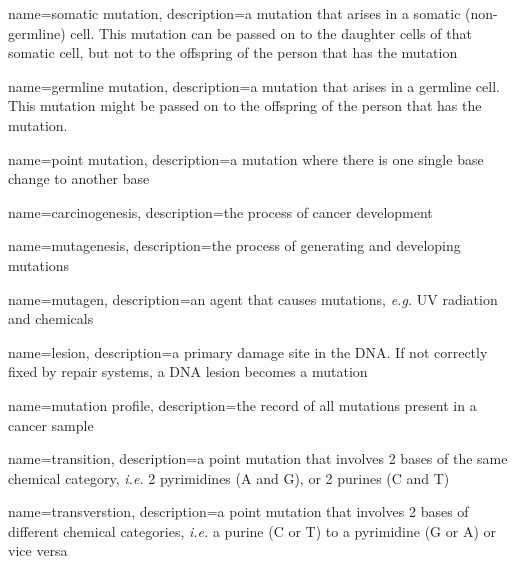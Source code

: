 {
        name=somatic mutation,
        description={a mutation that arises in a somatic (non-germline) cell. This mutation can be passed on to the daughter cells of that somatic cell, but not to the offspring of the person that has the mutation}
}

{
        name=germline mutation,
        description={a mutation that arises in a germline cell. This mutation might be passed on to the offspring of the person that has the mutation.}
}

{
        name=point mutation,
        description={a mutation where there is one single base change to another base}
}

{
        name=carcinogenesis,
        description={the process of cancer development}
}

{
        name=mutagenesis,
        description={the process of generating and developing mutations}
}

{
        name=mutagen,
        description={an agent that causes mutations, \textit{e.g.} UV radiation and chemicals}
}

{
        name=lesion,
        description={a primary damage site in the DNA. If not correctly fixed by repair systems, a DNA lesion becomes a mutation}
}

{
        name=mutation profile,
        description={the record of all mutations present in a cancer sample}
}

{
        name=transition,
        description={a point mutation that involves 2 bases of the same chemical category, \textit{i.e.} 2 pyrimidines (A and G), or 2 purines (C and T)}
}

{
        name=transverstion,
        description={a point mutation that involves 2 bases of different chemical categories, \textit{i.e.} a purine (C or T) to a pyrimidine (G or A) or vice versa}
}